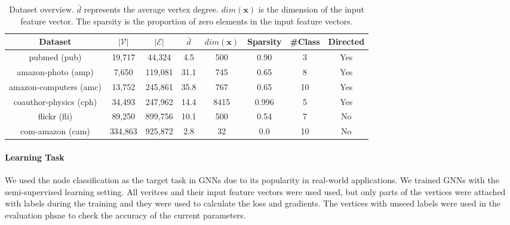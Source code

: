 \begin{table}
	\centering
	\small
	\begin{tabular}{cccccccc}
		\toprule
		Dataset                                                 & $|\mathcal{V}|$ & $|\mathcal{E}|$ & $\bar{d}$ & $dim(\boldsymbol{x})$ & Sparsity & \#Class & Directed \\
		\midrule
		pubmed (pub) \cite{yang2016_revisiting_semisupervised}  & 19,717          & 44,324          & 4.5       & 500                   & 0.90     & 3       & Yes      \\
		amazon-photo (amp) \cite{shchur2018_pitfall_of_gnn}     & 7,650           & 119,081         & 31.1      & 745                   & 0.65     & 8       & Yes      \\
		amazon-computers (amc) \cite{shchur2018_pitfall_of_gnn} & 13,752          & 245,861         & 35.8      & 767                   & 0.65     & 10      & Yes      \\
		coauthor-physics (cph) \cite{shchur2018_pitfall_of_gnn} & 34,493          & 247,962         & 14.4      & 8415                  & 0.996    & 5       & Yes      \\
		flickr (fli) \cite{zeng2020_graphsaint}                 & 89,250          & 899,756         & 10.1      & 500                   & 0.54     & 7       & No       \\
		com-amazon (cam) \cite{yang2012_defining}               & 334,863         & 925,872         & 2.8       & 32                    & 0.0      & 10      & No       \\
		\bottomrule
	\end{tabular}
	\caption{Dataset overview. $\bar{d}$ represents the average vertex degree. $dim(\boldsymbol{x})$ is the dimension of the input feature vector. The sparsity is the proportion of zero elements in the input feature vectors.}
	\label{tab:dataset_overview}
\end{table}

\paragraph{Learning Task}
We used the node classification as the target task in GNNs due to its popularity in real-world applications.
We trained GNNs with the semi-supervised learning setting.
All veritces and their input feature vectors were used used, but only parts of the vertices were attached with labels during the training and they were used to calculate the loss and gradients.
The vertices with unseed labels were used in the evaluation phsae to check the accuracy of the current parameters.

